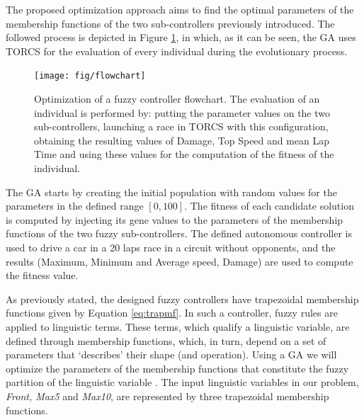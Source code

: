 \documentclass[conference]{IEEEtran}
\begin{document}

The proposed optimization approach aims to find the optimal parameters of the membership functions of the two sub-controllers previously introduced. 
The followed process is depicted in Figure \ref{fig:ga}, in which, as it can be seen, the GA uses TORCS for the evaluation of every individual during the evolutionary process.

\begin{figure}[!ht]
  \label{fig:ga}
  \begin{center}
    \texttt{[image: fig/flowchart]}
  \end{center}
  \caption{Optimization of a fuzzy controller flowchart. The evaluation of an individual is performed by: putting the parameter values on the two sub-controllers, launching a race in TORCS with this configuration, obtaining the resulting values of Damage, Top Speed and mean Lap Time and using these values for the computation of the fitness of the individual.}
\end{figure}
	
The GA starts by creating the initial population with random values
for the parameters in the defined range $[0,100]$. The fitness of each
candidate solution is computed by injecting its gene values to the
parameters of the membership functions of the two fuzzy
sub-controllers. The defined autonomous controller is used to drive a
car in a 20 laps race in a circuit without opponents, and the
results (Maximum, Minimum and Average speed, Damage) are used to compute the fitness value. 


As previously stated, the designed fuzzy controllers have trapezoidal membership functions given by Equation \ref{eq:trapmf}.
In such a controller, fuzzy rules are applied to linguistic
terms. These terms, which qualify a linguistic variable, are defined
through membership functions, which, in turn, depend on a set of
parameters that `describes' their shape (and operation). Using a GA we
will optimize the parameters of the membership functions that
constitute the fuzzy partition of the linguistic variable
\cite{ThangG08}. The input linguistic variables in our problem,
\textit{Front, Max5} and \textit{Max10}, are represented by three
trapezoidal membership functions. 
\end{document}

